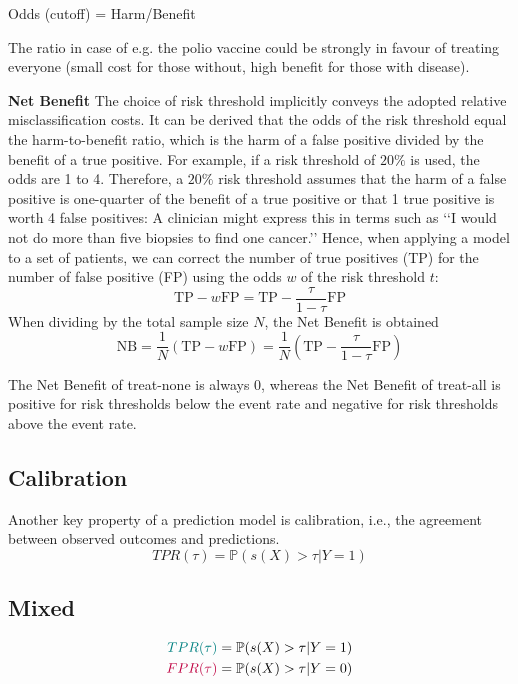 Odds (cutoff) = Harm/Benefit

The ratio in case of e.g. the polio vaccine could be strongly in favour of treating everyone (small cost for those without, high benefit for those with disease).


\textbf{Net Benefit}
The choice of risk threshold implicitly conveys the adopted relative misclassification costs. 
It can be derived that the odds of the risk threshold equal the harm-to-benefit ratio, which is the harm of a false positive divided by the benefit of a true positive.
For example, if a risk threshold of $20\%$ is used, the odds are 1 to 4. 
Therefore, a $20\%$ risk threshold assumes that the harm of a false positive is one-quarter of the benefit of a true positive or that 1 true positive is worth 4 false positives: 
A clinician might express this in terms such as ‘‘I would not do more than five biopsies to find one cancer.’’ 
Hence, when applying a model to a set of patients,
we can correct the number of true positives (TP) for the number of false positive (FP) using the odds $w$ of the risk threshold $t$: 
\[
	\text{TP} - w \text{FP} = \text{TP} - \frac{\tau}{1-\tau} \text{FP}
\]
When dividing by the total sample size $N$, the Net Benefit is obtained
\[
	\text{NB} = \frac{1}{N} (\text{TP} - w \text{FP}) = \frac{1}{N} (\text{TP} - \frac{\tau}{1-\tau} \text{FP})
\]

The Net Benefit of treat-none is always 0, 
whereas the Net Benefit of treat-all is positive for risk thresholds below the event rate and negative for risk thresholds above the event rate.
	
	
\subsection{Calibration}
Another key property of a prediction model is calibration, i.e., the agreement between observed outcomes and predictions.
\[
	TPR(\tau) = \mathbb{P}(s(X) > \tau | Y = 1)
\]


\subsection{Mixed}
	\begin{align*}
    		\color{teal} TPR(\tau) &= \mathbb{P}(s(X) > \tau | Y = 1) \\
    		\color{purple} FPR(\tau) &= \mathbb{P}(s(X) > \tau | Y = 0) \\
    	\end{align*}


